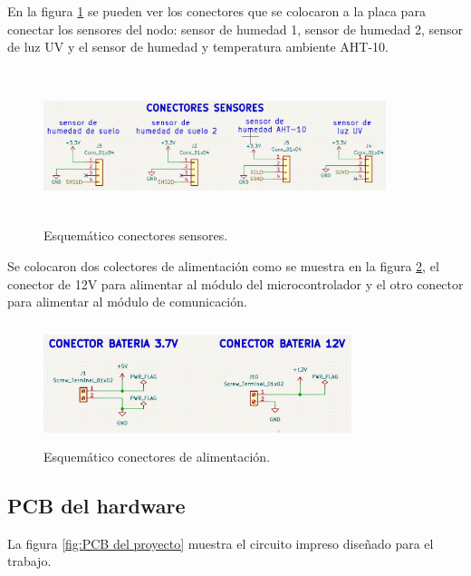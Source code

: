En la figura \ref{fig:esquematico conectores sensores} se pueden ver los conectores que se colocaron a la placa para conectar los sensores del nodo: sensor de humedad 1, sensor de humedad 2, sensor de luz UV y el sensor de humedad y temperatura ambiente AHT-10.
\begin{figure}[h]
  \centering
	\includegraphics[width=10cm, height=4.5cm]{./Figures/conectores_sensores.png}
	\caption{Esquemático conectores sensores.}
	\label{fig:esquematico conectores sensores}
\end{figure}

Se colocaron dos colectores de alimentación como se muestra en la figura \ref{fig:esquematico conectores alimentacion}, el conector de 12V para alimentar al módulo del microcontrolador y el otro conector para alimentar al módulo de comunicación.
\begin{figure}[h]
  \centering
	\includegraphics[width=9cm, height=3.5cm]{./Figures/esquematico_alimentacion.png}
	\caption{Esquemático conectores de alimentación.}
	\label{fig:esquematico conectores alimentacion}
\end{figure}

\subsection{PCB del hardware} 
La figura \ref{fig:PCB del proyecto} muestra el circuito impreso diseñado para el trabajo.

